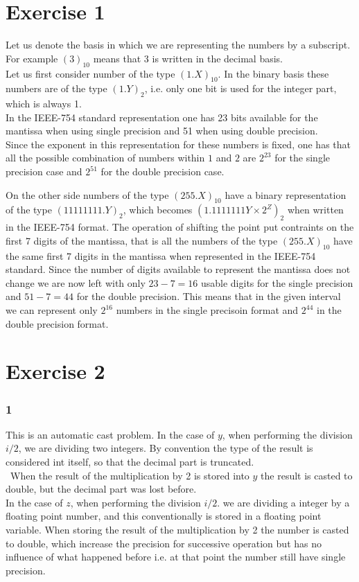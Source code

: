 \documentclass{article}
\begin{document}
\section*{Exercise 1}
    Let us denote the basis in which we are representing the numbers by a subscript. For example $(3)_{10}$ means that 3 is written in the decimal basis. \\
    Let us first consider number of the type $(1.X)_{10}$. In the binary basis these numbers are of the type $(1.Y)_2$, i.e. only one bit is used for the integer part, which is always 1. \\
    In the IEEE-754 standard representation one has 23 bits available for the mantissa when using single precision and 51 when using double precision. \\
    Since the exponent in this representation for these numbers is fixed, one has that all the possible combination of numbers within $1$ and $2$ are $2^{23}$ for the single precision case
    and $2^{51}$ for the double precision case. \par
    \vspace{15pt}
    On the other side numbers of the type $(255.X)_{10}$ have a binary representation of the type $(11111111.Y)_2$, which becomes 
    $(1.1111111Y \times 2^Z)_2$ when written in the IEEE-754 format. The operation of shifting the point put contraints on the first 7 digits of the mantissa, that is all the numbers of the type $(255.X)_10$ have the same first 7 digits in the mantissa when represented in the IEEE-754 standard.
    Since the number of digits available to represent the mantissa does not change we are now left with only $23-7=16$ usable digits for the single precision and $51-7=44$ for the double precision. This means that in the given interval we can represent only $2^{16}$ numbers in the single precisoin format 
    and $2^{44}$ in the double precision format.

\section*{Exercise 2}
\subsubsection*{1}
This is an automatic cast problem. In the case of $y$, when performing the division $i/2$, we are dividing two integers. By convention the type of the result is considered int itself, so that the decimal part is truncated. \\\
When the result of the multiplication by 2 is stored into $y$ the result is casted to double, but the decimal part was lost before. \\
In the case of $z$, when performing the division $i/2.$ we are dividing a integer by a floating point number, and this conventionally is stored in a floating point variable. When storing the result of the multiplication by 2 
the number is casted to double, which increase the precision for successive operation but has no influence of what happened before i.e. at that point the number still have single precision.
\end{document}
